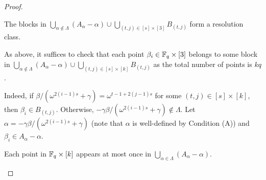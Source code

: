 \documentclass[draft, 11pt]{article}
\begin{document}
\begin{proof}
                                                      
\begin{claim}\label{claim:parallel}
The blocks in $\bigcup_{\alpha\notin\Lambda}
(A_\alpha-\alpha) \cup \bigcup_{(t,j)\in [s]\times [3]}
B_{(t,j)}$ form a resolution class.
\end{claim}

As above, it suffices to check that each point
$\beta_i\in\mathbb F_q\times [3]$ belongs to some block in
$\bigcup_{\alpha\notin\Lambda} (A_\alpha-\alpha) \cup
\bigcup_{(t,j)\in [s]\times [k]} B_{(t,j)}$ as the total
number of points is $kq$.

Indeed, if $\beta/(\omega^{2(i-1)s}+\gamma)=\omega^{t-1+2(j-1)s}$ 
for some $(t,j)\in [s]\times [k]$, then $\beta_i\in B_{(t,j)}$. Otherwise,
$-\gamma\beta/(\omega^{2(i-1)s}+\gamma) \notin\Lambda$. 
Let $\alpha=-\gamma\beta/(\omega^{2(i-1)s}+\gamma)$ 
(note that $\alpha$ is well-defined by Condition (A)) and
$\beta_i\in A_\alpha-\alpha$.


\begin{claim}\label{claim:partial}
Each point in $\mathbb F_q\times[k]$ appears at most once in
$\bigcup_{\alpha\in\Lambda}
\left(A_\alpha-\alpha\right)$.
\end{claim}


\end{proof}
\end{document}
